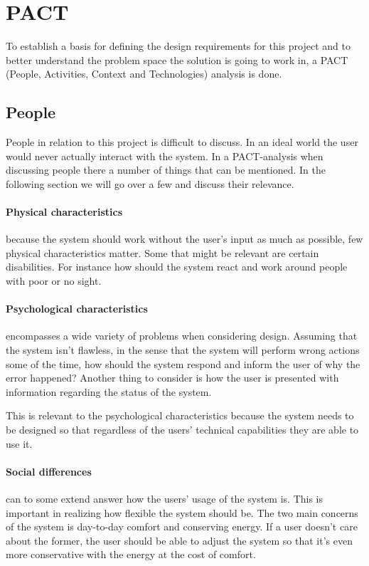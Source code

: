 \section{PACT}
To establish a basis for defining the design requirements for this project and
to better understand the problem space the solution is going to work in, a PACT
(People, Activities, Context and Technologies) analysis is done.

\subsection{People}
People in relation to this project is difficult to discuss. In an ideal world the user would never actually interact with the system. In a PACT-analysis when discussing people there a number of things that can be mentioned. In the following section we will go over a few and discuss their relevance.

\paragraph{Physical characteristics} because the system should work without the user's input as much as possible, few physical characteristics matter. Some that might be relevant are certain disabilities. For instance how should the system react and work around people with poor or no sight.

\paragraph{Psychological characteristics} encompasses a wide variety of problems
when considering design. Assuming that the system isn't flawless, in the
  sense that the system will perform wrong actions some of the time, how should
the system respond and inform the user of why the error happened? Another thing
to consider is how the user is presented with information regarding the status
of the system.

This is relevant to the psychological characteristics because the system needs to be designed so that regardless of the users' technical capabilities they are able to use it.

\paragraph{Social differences} can to some extend answer how the users' usage of
the system is. This is important in realizing how flexible the system should be.
The two main concerns of the system is day-to-day comfort and conserving energy.
If a user doesn't care about the former, the user should be able to adjust the system so that it's even more conservative with the energy at the cost of comfort.

